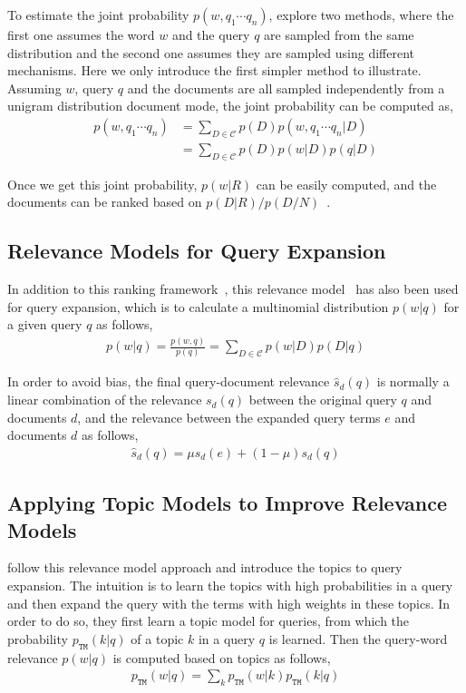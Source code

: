 To estimate the joint probability $p(w,q_1 \cdots q_n)$, \cite{Lavrenko-2001} explore two methods, where the first one assumes the word $w$ and the query $q$ are sampled from the same distribution and the second one assumes they are sampled using different mechanisms. Here we only introduce the first simpler method to illustrate. Assuming $w$, query $q$ and the documents are all sampled independently from a unigram distribution document mode, the joint probability can be computed as,
\begin{align}
p(w,q_1 \cdots q_n) &= \sum_{D \in \mathcal{C}} p(D) p(w,q_1 \cdots q_n | D) \\
&= \sum_{D \in \mathcal{C}} p(D) p(w|D) p(q | D)
\end{align}

Once we get this joint probability, $p(w|R)$ can be easily computed, and the documents can be ranked based on $p(D|R) / p(D/N)$~\citep{Robertson-1997}. 

\subsection{Relevance Models for Query Expansion}

In addition to this ranking framework~\citep{Robertson-1997}, this relevance model~\citep{Lavrenko-2001} has also been used for query expansion, which is to calculate a multinomial distribution $p(w|q)$ for a given query $q$ as follows,
\begin{align}
p(w|q) = \frac{p(w, q)}{p(q)} = \sum_{D \in \mathcal{C}} p(w|D) p(D|q)
\end{align}

In order to avoid bias, the final query-document relevance $\hat{s}_d(q)$ is normally a linear combination of the relevance $s_d(q)$ between the original query $q$ and documents $d$, and the relevance between the expanded query terms $e$ and documents $d$ as follows,
\begin{align}
\label{eq:rm_qe}
\hat{s}_d(q) = \mu s_d(e) + (1-\mu)s_d(q) 
\end{align}

\subsection{Applying Topic Models to Improve Relevance Models}

\cite{Yi-2009} follow this relevance model approach and introduce the topics to query expansion. The intuition is to learn the topics with high probabilities in a query and then expand the query with the terms with high weights in these topics. In order to do so, they first learn a topic model for queries, from which the probability $p_{\texttt{TM}}(k|q)$ of a topic $k$ in a query $q$ is learned. Then the query-word relevance $p(w|q)$ is computed based on topics as follows,
\begin{align}
\label{eq:query_word_prob}
p_{\texttt{TM}}(w|q) = \sum_k p_{\texttt{TM}}(w|k) p_{\texttt{TM}}(k|q)
\end{align}

